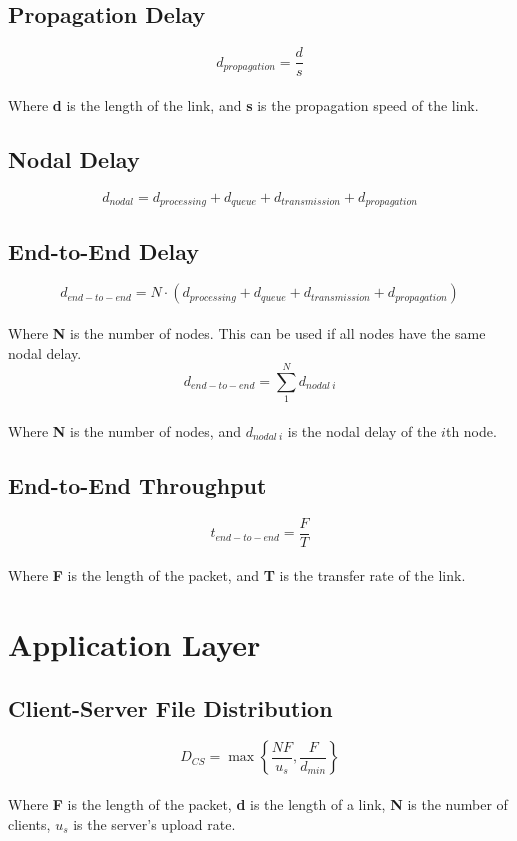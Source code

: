 \documentclass{article}
\begin{document}
\subsection{Propagation Delay}
\vspace{.3cm}
\[ d_{propagation} = \frac{d}{s} \] \\
Where \textbf{d} is the length of the link, and \textbf{s} is the propagation speed of the link.

\subsection{Nodal Delay}
\vspace{.3cm}
\[ d_{nodal} = d_{processing} + d_{queue} + d_{transmission} + d_{propagation} \]

\subsection{End-to-End Delay}
\vspace{.3cm}
\[ d_{end-to-end} = N \cdot (d_{processing} + d_{queue} + d_{transmission} + d_{propagation}) \] \\
Where \textbf{N} is the number of nodes. This can be used if all nodes have the same nodal delay.
\[ d_{end-to-end} = \sum^N_1 d_{nodal~i} \] \\
Where \textbf{N} is the number of nodes, and $d_{nodal~i}$ is the nodal delay of the $i$th node.

\subsection{End-to-End Throughput}
\vspace{.3cm}
\[ t_{end-to-end} = \frac{F}{T} \] \\
Where \textbf{F} is the length of the packet, and \textbf{T} is the transfer rate of the link.

\section{Application Layer}
\subsection{Client-Server File Distribution}
\vspace{.3cm}
\[ D_{CS} = \max \left\{ \frac{NF}{u_s}, \frac{F}{d_{min}} \right\} \] \\
Where \textbf{F} is the length of the packet, \textbf{d} is the length of a link, \textbf{N} is the number of clients, $u_s$ is the server's upload rate.
\end{document}
